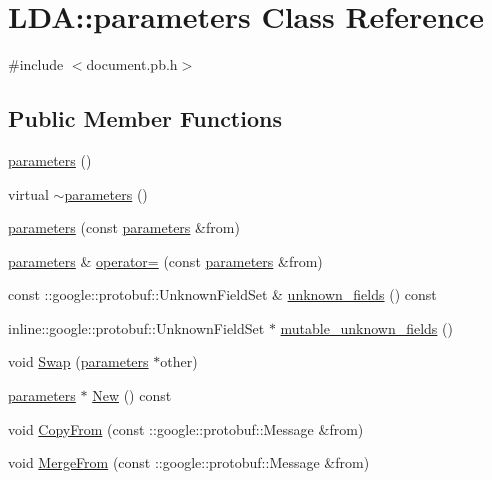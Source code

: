 \hypertarget{class_l_d_a_1_1parameters}{
\section{LDA::parameters Class Reference}
\label{class_l_d_a_1_1parameters}
}


{\ttfamily \#include $<$document.pb.h$>$}

\subsection*{Public Member Functions}
\begin{DoxyCompactItemize}
\item 
\hyperlink{class_l_d_a_1_1parameters_ac79ed72ff12174ebfd8c0f197de1731d}{parameters} ()
\item 
virtual \hyperlink{class_l_d_a_1_1parameters_a5e50e4547d209782fbfc305ceb5d011a}{$\sim$parameters} ()
\item 
\hyperlink{class_l_d_a_1_1parameters_af3e3c7327cd115e60670239997931a42}{parameters} (const \hyperlink{class_l_d_a_1_1parameters}{parameters} \&from)
\item 
\hyperlink{class_l_d_a_1_1parameters}{parameters} \& \hyperlink{class_l_d_a_1_1parameters_a236097014789639e6b331d17ef526a25}{operator=} (const \hyperlink{class_l_d_a_1_1parameters}{parameters} \&from)
\item 
const ::google::protobuf::UnknownFieldSet \& \hyperlink{class_l_d_a_1_1parameters_aff87788d6ce916e7a1d496d9f0e475d4}{unknown\_\-fields} () const 
\item 
inline::google::protobuf::UnknownFieldSet $\ast$ \hyperlink{class_l_d_a_1_1parameters_ae450b6dcde59b497409636fbe1a82f7f}{mutable\_\-unknown\_\-fields} ()
\item 
void \hyperlink{class_l_d_a_1_1parameters_acf79c7d57dec43bc2d78f0866588359d}{Swap} (\hyperlink{class_l_d_a_1_1parameters}{parameters} $\ast$other)
\item 
\hyperlink{class_l_d_a_1_1parameters}{parameters} $\ast$ \hyperlink{class_l_d_a_1_1parameters_ab0fa3fbe376bdf09d54f67ad37fa99c1}{New} () const 
\item 
void \hyperlink{class_l_d_a_1_1parameters_a9c63de970efdf555031d74daa4ba9bf7}{CopyFrom} (const ::google::protobuf::Message \&from)
\item 
void \hyperlink{class_l_d_a_1_1parameters_ada86da0ba8a80442b5a71896a4897450}{MergeFrom} (const ::google::protobuf::Message \&from)
\item 

\end{DoxyCompactItemize}
